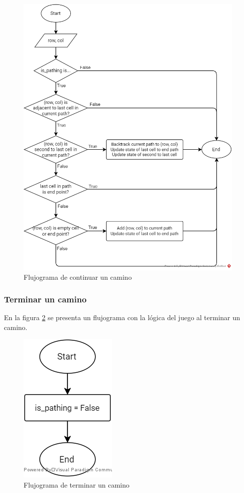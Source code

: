 \documentclass[letter,12pt]{article}
\begin{document}
\begin{figure}[ht!]
	\centering
	\includegraphics[scale=0.7]{img/fc_continue_path.png}
	\caption{Flujograma de continuar un camino}
	\label{fig:continuar_camino}
\end{figure}

\subsubsection{Terminar un camino} \label{diseño:logica:terminar}

En la figura \ref{fig:terminar_camino} se presenta un flujograma con la lógica del juego al terminar un camino. \par

\begin{figure}[ht!]
	\centering
	\includegraphics[scale=0.7]{img/fc_end_path.png}
	\caption{Flujograma de terminar un camino}
	\label{fig:terminar_camino}
\end{figure}
\end{document}
